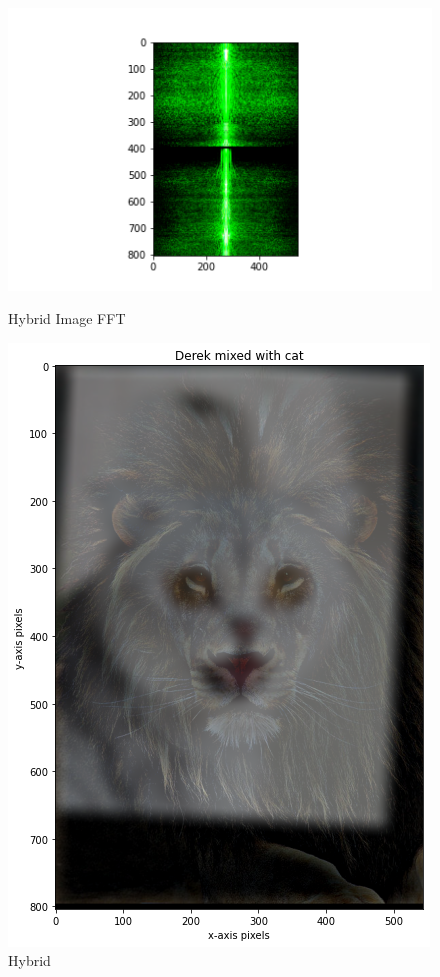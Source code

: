 \documentclass{article}
\begin{document}
\begin{figure}[!htb]
    \includegraphics[width=\linewidth]{hybrid fourier.png}
    \caption{Hybrid Image FFT}\label{fig:awesome_image1}
\endminipage
{}
    \includegraphics[width=\linewidth]{lioncat.png}
    \caption{Hybrid}\label{fig:awesome_image2}
\endminipage
\end{figure}
\FloatBarrier
\end{document}
